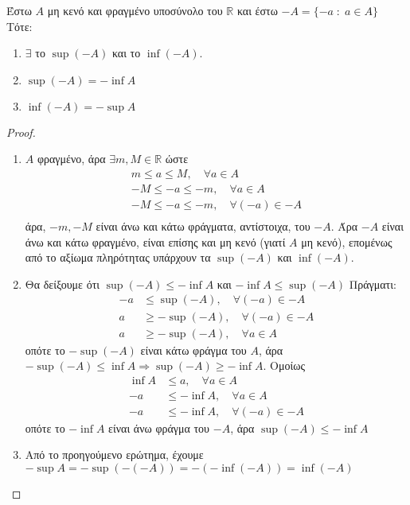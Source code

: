 \begin{mybox3}
\begin{prop}
  Έστω $ A $ μη κενό και φραγμένο υποσύνολο του $ \mathbb{R} $ και έστω 
  $ -A = \{ -a \; : \; a \in A \} $ Τότε:
  \begin{enumerate}
    \item $ \exists $ το $ \sup (-A) $ και το $ \inf (-A) $.
    \item $ \sup (-A) = - \inf A $
    \item $ \inf (-A) = - \sup A $
  \end{enumerate}
\end{prop}
\end{mybox3}
\begin{proof}
\item {}
  \begin{enumerate}
    \item $ A $ φραγμένο, άρα $ \exists m,M \in \mathbb{R} $ ώστε 
      \begin{gather*} 
        m  \leq  a \leq M, \quad \forall a \in A \\
        -M  \leq - a \leq -m, \quad \forall a \in A \\
        -M  \leq - a \leq -m, \quad \forall (-a) \in -A \\
      \end{gather*}
      άρα, $ -m,-M $ είναι άνω και κάτω φράγματα, αντίστοιχα, του $ -A $. Άρα 
      $ -A $ είναι άνω και κάτω φραγμένο, είναι επίσης και μη κενό (γιατί $A$ μη κενό), 
      επομένως από το αξίωμα πληρότητας υπάρχουν τα $ \sup (-A) $ και $ \inf (-A) $.
    \item Θα δείξουμε ότι $ \sup (-A) \leq - \inf A $ και $ - \inf A \leq \sup (-A) $
      Πράγματι:
      \begin{align*}
        -a &\leq \sup (-A), \quad \forall (-a) \in -A \\
        a &\geq -\sup (-A), \quad \forall (-a) \in -A \\
        a &\geq -\sup (-A), \quad \forall a \in A 
      \end{align*}
      οπότε το $ -\sup(-A) $ είναι κάτω φράγμα του $A$, άρα $ - \sup (-A) \leq \inf A
      \Rightarrow \sup (-A) \geq -\inf A $. Ομοίως 
      \begin{align*}
        \inf A &\leq a, \quad \forall a \in A \\
        - a &\leq - \inf A, \quad \forall a \in A \\
        - a &\leq - \inf A, \quad \forall (-a) \in -A 
      \end{align*}
      οπότε το $ - \inf A $ είναι άνω φράγμα του $ -A $, άρα $ \sup (-A) \leq - \inf
      A $
    \item Από το προηγούμενο ερώτημα, έχουμε $ - \sup A = - \sup (-(-A)) = - (- \inf (-A)) = \inf (-A) $ 
  \end{enumerate}
\end{proof}



